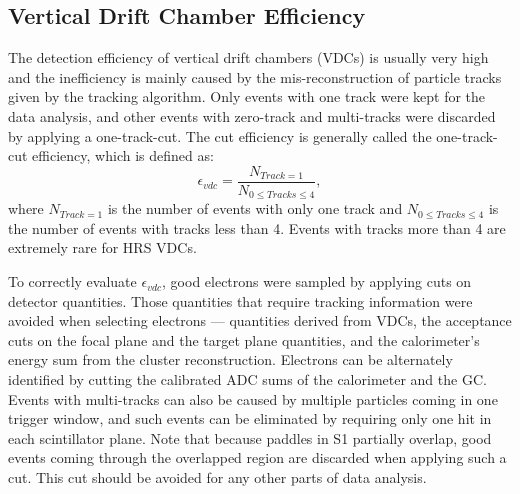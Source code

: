\subsection{Vertical Drift Chamber Efficiency}
 The detection efficiency of vertical drift chambers (VDCs) is usually very high and the inefficiency is mainly caused by the mis-reconstruction of particle tracks given by the tracking algorithm. Only events with one track were kept for the data analysis, and other events with zero-track and multi-tracks were discarded by applying a one-track-cut. The cut efficiency is generally called the one-track-cut efficiency, which is defined as:
\begin{equation}
  \epsilon_{vdc} = \frac{N_{Track=1}}{N_{0\leq Tracks\leq 4}},
  \label{eq_vdc_eff}
\end{equation}
where $N_{Track=1}$ is the number of events with only one track and $N_{0\leq Tracks\leq 4}$ is the number of events with tracks less than 4. Events with tracks more than 4 are extremely rare for HRS VDCs.

  To correctly evaluate $\epsilon_{vdc}$, good electrons were sampled by applying cuts on detector quantities. Those quantities that require tracking information were avoided when selecting electrons --- quantities derived from VDCs, the acceptance cuts on the focal plane and the target plane quantities, and the calorimeter's energy sum from the cluster reconstruction. Electrons can be alternately identified by cutting the calibrated ADC sums of the calorimeter and the GC. Events with multi-tracks can also be caused by multiple particles coming in one trigger window, and such events can be eliminated by requiring only one hit in each scintillator plane. Note that because paddles in S1 partially overlap, good events coming through the overlapped region are discarded when applying such a cut. This cut should be avoided for any other parts of data analysis.
  
